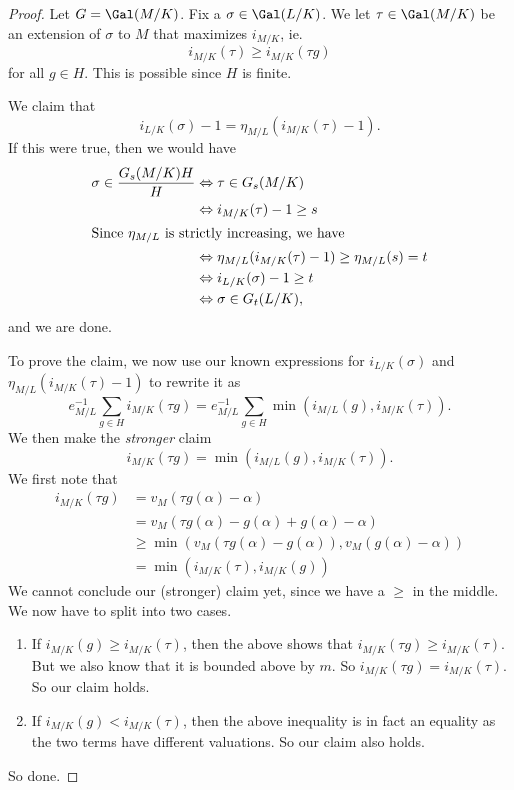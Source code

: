 \documentclass[a4paper]{article}
\begin{document}
\begin{proof}
  Let $G = \Gal(M/K)$. Fix a $\sigma \in \Gal(L/K)$. We let $\tau \in \Gal(M/K)$ be an extension of $\sigma$ to $M$ that maximizes $i_{M/K}$, ie.
  \[
    i_{M/K}(\tau) \geq i_{M/K}(\tau g)
  \]
  for all $g \in H$. This is possible since $H$ is finite.

  We claim that
  \[
    i_{L/K}(\sigma) - 1 = \eta_{M/L}(i_{M/K}(\tau) - 1).
  \]
  If this were true, then we would have
  \begin{align*}
    \sigma \in \frac{G_s(M/K)H}{H} &\Leftrightarrow \tau \in G_s(M/K)\\
    &\Leftrightarrow i_{M/K}(\tau) - 1 \geq s\\
    \intertext{Since $\eta_{M/L}$ is strictly increasing, we have}
    &\Leftrightarrow \eta_{M/L}(i_{M/K}(\tau) - 1) \geq \eta_{M/L}(s) = t\\
    &\Leftrightarrow i_{L/K}(\sigma) - 1 \geq t \\
    &\Leftrightarrow \sigma \in G_t(L/K),
  \end{align*}
  and we are done.

  To prove the claim, we now use our known expressions for $i_{L/K}(\sigma)$ and $\eta_{M/L}(i_{M/K}(\tau) - 1)$ to rewrite it as
  \[
    e^{-1}_{M/L} \sum_{g \in H} i_{M/K}(\tau g) = e_{M/L}^{-1} \sum_{g \in H} \min (i_{M/L}(g), i_{M/K}(\tau)).
  \]
  We then make the \emph{stronger} claim
  \[
    i_{M/K}(\tau g) = \min (i_{M/L}(g), i_{M/K}(\tau)).
  \]
  We first note that
  \begin{align*}
    i_{M/K}(\tau g) &= v_M(\tau g(\alpha) - \alpha) \\
    &= v_M(\tau g(\alpha) - g(\alpha) + g(\alpha) - \alpha) \\
    &\geq \min(v_M(\tau g(\alpha) - g(\alpha)), v_M(g(\alpha) - \alpha))\\
    &= \min(i_{M/K}(\tau), i_{M/K}(g))
  \end{align*}
  We cannot conclude our (stronger) claim yet, since we have a $\geq$ in the middle. We now have to split into two cases.
  \begin{enumerate}
    \item If $i_{M/K}(g) \geq i_{M/K}(\tau)$, then the above shows that $i_{M/K}(\tau g) \geq i_{M/K}(\tau)$. But we also know that it is bounded above by $m$. So $i_{M/K}(\tau g) = i_{M/K}(\tau)$. So our claim holds.
    \item If $i_{M/K}(g) < i_{M/K}(\tau)$, then the above inequality is in fact an equality as the two terms have different valuations. So our claim also holds.
  \end{enumerate}
  So done.
\end{proof}
\end{document}
